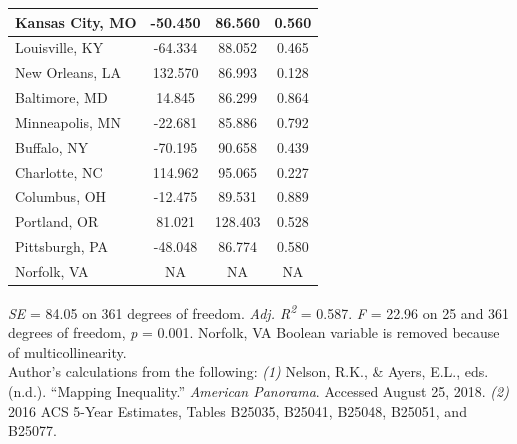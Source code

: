 \documentclass[paper=letter, fontsize=12pt]{scrartcl} %
\begin{document}
\begin{table}
\begin{center}
\begin{tabular}{|| l | c c c ||}
			\hline
			Kansas City, MO & -50.450 & 86.560 & 0.560 \\
			\hline
			Louisville, KY & -64.334 & 88.052 & 0.465 \\
			\hline
			New Orleans, LA & 132.570 & 86.993 & 0.128 \\
			\hline
			Baltimore, MD & 14.845 & 86.299 & 0.864 \\
			\hline
			Minneapolis, MN & -22.681 & 85.886 & 0.792 \\
			\hline
			Buffalo, NY & -70.195 & 90.658 & 0.439 \\
			\hline
			Charlotte, NC & 114.962 & 95.065 & 0.227 \\
			\hline
			Columbus, OH & -12.475 & 89.531 & 0.889 \\
			\hline
			Portland, OR & 81.021 & 128.403 & 0.528 \\
			\hline
			Pittsburgh, PA & -48.048 & 86.774 & 0.580 \\
			\hline
			Norfolk, VA & NA & NA & NA \\
			\hline
		\end{tabular}
	\end{center}
\textit{SE} = 84.05 on 361 degrees of freedom. \textit{Adj. R\textsuperscript{2}} = 0.587. \textit{F} = 22.96 on 25 and 361 degrees of freedom, \textit{p} = 0.001. Norfolk, VA Boolean variable is removed because of multicollinearity.\\
Author's calculations from the following: \textit{(1)} Nelson, R.K., \& Ayers, E.L., eds. (n.d.). ``Mapping Inequality.'' \textit{American Panorama}. Accessed August 25, 2018. \textit{(2)} 2016 ACS 5-Year Estimates, Tables B25035, B25041, B25048, B25051, and B25077.
\end{table}
\end{document}
